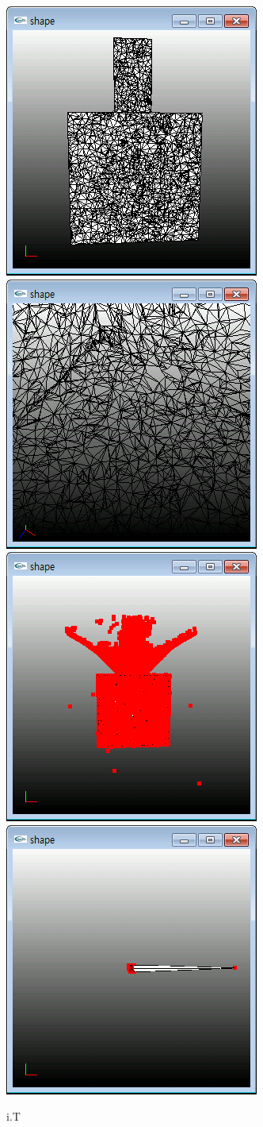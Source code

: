 \documentclass[11pt]{article}
\begin{document}
\begin{figure}[ht]
\centering
\includegraphics[width=.23\textwidth]{FIGS/T1}
\hspace{0.2cm}
\includegraphics[width=.23\textwidth]{FIGS/T2}
\hspace{0.2cm}
\includegraphics[width=.23\textwidth]{FIGS/T3}
\hspace{0.2cm}
\includegraphics[width=.23\textwidth]{FIGS/T4}
\caption{i.T}
\end{figure}
\end{document}

